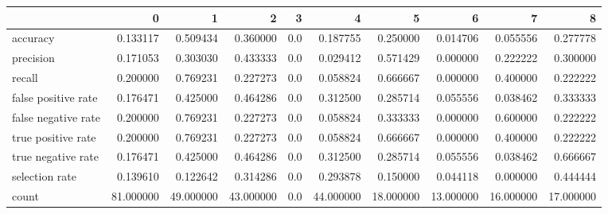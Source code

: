 \begin{tabular}{lrrrrrrrrr}
\toprule
{} &          0 &          1 &          2 &    3 &          4 &          5 &          6 &          7 &          8 \\
\midrule
accuracy            &   0.133117 &   0.509434 &   0.360000 &  0.0 &   0.187755 &   0.250000 &   0.014706 &   0.055556 &   0.277778 \\
precision           &   0.171053 &   0.303030 &   0.433333 &  0.0 &   0.029412 &   0.571429 &   0.000000 &   0.222222 &   0.300000 \\
recall              &   0.200000 &   0.769231 &   0.227273 &  0.0 &   0.058824 &   0.666667 &   0.000000 &   0.400000 &   0.222222 \\
false positive rate &   0.176471 &   0.425000 &   0.464286 &  0.0 &   0.312500 &   0.285714 &   0.055556 &   0.038462 &   0.333333 \\
false negative rate &   0.200000 &   0.769231 &   0.227273 &  0.0 &   0.058824 &   0.333333 &   0.000000 &   0.600000 &   0.222222 \\
true positive rate  &   0.200000 &   0.769231 &   0.227273 &  0.0 &   0.058824 &   0.666667 &   0.000000 &   0.400000 &   0.222222 \\
true negative rate  &   0.176471 &   0.425000 &   0.464286 &  0.0 &   0.312500 &   0.285714 &   0.055556 &   0.038462 &   0.666667 \\
selection rate      &   0.139610 &   0.122642 &   0.314286 &  0.0 &   0.293878 &   0.150000 &   0.044118 &   0.000000 &   0.444444 \\
count               &  81.000000 &  49.000000 &  43.000000 &  0.0 &  44.000000 &  18.000000 &  13.000000 &  16.000000 &  17.000000 \\
\bottomrule
\end{tabular}
